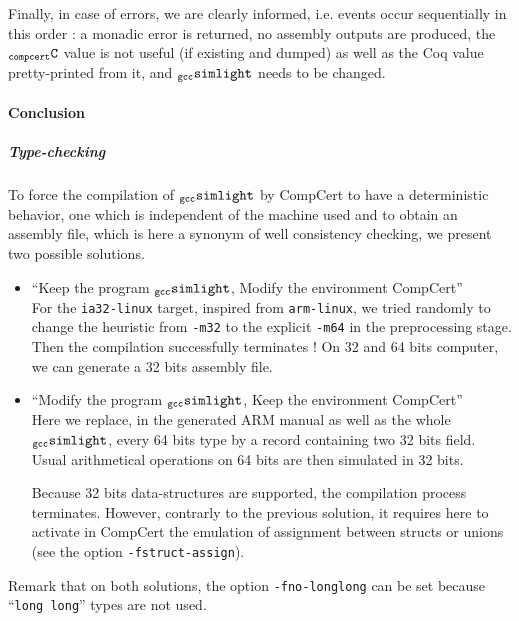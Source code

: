 \documentclass[a4paper, 11pt]{article}
\newcommand{\gccSL}{$_{\tt gcc}{\tt simlight}$\xspace}
\newcommand{\C}{$_{\tt compcert}{\tt C}$\xspace}
\begin{document}
Finally, in case of errors, we are clearly informed, i.e. events occur sequentially in this order : a monadic error is returned, no assembly outputs are produced, the \C value is not useful (if existing and dumped) as well as the Coq value pretty-printed from it, and \gccSL needs to be changed.
\paragraph{Conclusion}
\subparagraph{Type-checking}
To force the compilation of \gccSL by CompCert to have a deterministic behavior, one which is independent of the machine used and to obtain an assembly file, which is here a synonym of well consistency checking, we present two possible solutions.
\begin{itemize}
\item ``Keep the program \gccSL, Modify the environment CompCert''\\
For the \verb|ia32-linux| target, inspired from \verb|arm-linux|, we tried randomly to change the heuristic from \verb|-m32| to the explicit \verb|-m64| in the preprocessing stage. Then the compilation successfully terminates ! On 32 and 64 bits computer, we can generate a 32 bits assembly file.

\item ``Modify the program \gccSL, Keep the environment CompCert''\\
Here we replace, in the generated ARM manual as well as the whole \gccSL, every 64 bits type by a record containing two 32 bits field. Usual arithmetical operations on 64 bits are then simulated in 32 bits. 

Because 32 bits data-structures are supported, the compilation process terminates. 
However, contrarly to the previous solution, it requires here to activate in CompCert the emulation of assignment between structs or unions (see the option \verb|-fstruct-assign|). 
\end{itemize}

Remark that on both solutions, the option \verb|-fno-longlong| can be set because ``\verb|long long|'' types are not used.
\end{document}
